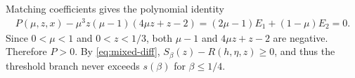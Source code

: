 \documentclass[10pt,a4paper]{article}
\newtheorem{lemma}[definition]{Lemma}
\begin{document}
    Matching coefficients gives the polynomial identity
    \begin{align}\label{eq:mixed-certificate}
      P(\mu,z,x)-\mu^3z(\mu-1)(4\mu z+z-2)
      =(2\mu-1)E_1+(1-\mu)E_2=0.
    \end{align}
    Since $0<\mu<1$ and $0<z<1/3$, both $\mu-1$ and $4\mu z+z-2$ are negative.
    Therefore $P>0$.  By \eqref{eq:mixed-diff},
    $S_\beta(z)-R(h,\eta,z)\ge0$, and thus the threshold branch never exceeds
    $s(\beta)$ for $\beta\le1/4$.





\end{document}
